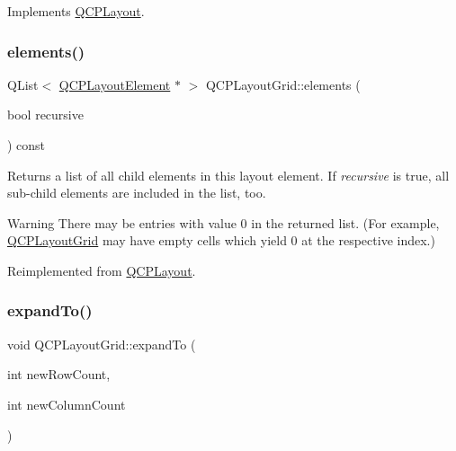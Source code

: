 Implements \mbox{\hyperlink{class_q_c_p_layout_a39d3e9ef5d9b82ab1885ba1cb9597e56}{Q\+C\+P\+Layout}}.

\mbox{\label{class_q_c_p_layout_grid_a7d5b968b4cf57393e9e387976d91f8f7}} 
\subsubsection{\texorpdfstring{elements()}{elements()}}
{\footnotesize\ttfamily Q\+List$<$ \mbox{\hyperlink{class_q_c_p_layout_element}{Q\+C\+P\+Layout\+Element}} $\ast$ $>$ Q\+C\+P\+Layout\+Grid\+::elements (\begin{DoxyParamCaption}\item[{bool}]{recursive }\end{DoxyParamCaption}) const\hspace{0.3cm}{\ttfamily [virtual]}}

Returns a list of all child elements in this layout element. If {\itshape recursive} is true, all sub-\/child elements are included in the list, too.

\begin{DoxyWarning}{Warning}
There may be entries with value 0 in the returned list. (For example, \mbox{\hyperlink{class_q_c_p_layout_grid}{Q\+C\+P\+Layout\+Grid}} may have empty cells which yield 0 at the respective index.) 
\end{DoxyWarning}


Reimplemented from \mbox{\hyperlink{class_q_c_p_layout_aca129722c019f91d3367046f80abfa77}{Q\+C\+P\+Layout}}.

\mbox{\label{class_q_c_p_layout_grid_a886c0dcbabd51a45da399e044552b685}} 
\subsubsection{\texorpdfstring{expandTo()}{expandTo()}}
{\footnotesize\ttfamily void Q\+C\+P\+Layout\+Grid\+::expand\+To (\begin{DoxyParamCaption}\item[{int}]{new\+Row\+Count,  }\item[{int}]{new\+Column\+Count }\end{DoxyParamCaption})}

